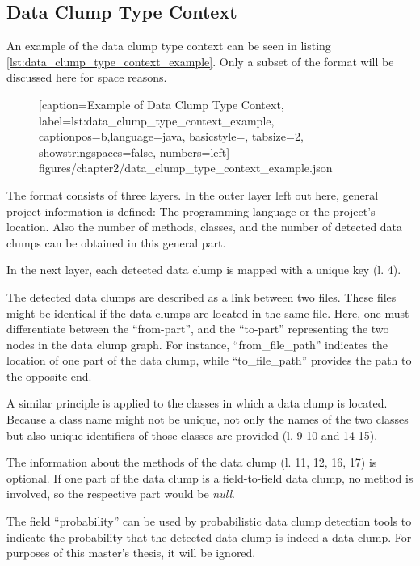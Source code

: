 
\renewcommand\appendixpagename{Appendix}
\begin{appendices}
\chapter{Data Clump Type Context}
\label{app:data_clump_format}
An example of the data clump type context can be seen in listing \ref{lst:data_clump_type_context_example}. Only a subset of the format will be discussed here for space reasons.

  \begin{figure} [htbp!]
			
			[caption={Example of Data Clump Type Context},
			label={lst:data_clump_type_context_example},
			captionpos=b,language=java, basicstyle=\footnotesize, tabsize=2, showstringspaces=false,  numbers=left]
			{figures/chapter2/data_clump_type_context_example.json}
		\end{figure}

The format consists of three layers. In the outer layer left out here, general project information is defined: The programming language or the project's location. Also the number of methods, classes, and the number of detected data clumps can be obtained in this general part. 

In the next layer, each detected data clump is mapped with a unique key (l. 4).

The detected data clumps are described as a link between two files. These files might be identical if the data clumps are located in the same file. Here, one must differentiate between the \enquote{from-part}, and the \enquote{to-part} representing the two nodes in the data clump graph. For instance, \enquote{from\_file\_path} indicates the location of one part of the data clump, while \enquote{to\_file\_path} provides the path to the opposite end. 

A similar principle is applied to the classes in which a data clump is located. Because a class name might not be unique, not only the names of the two classes but also unique identifiers of those classes are provided (l. 9-10 and 14-15).

The information about the methods of the data clump (l. 11, 12, 16, 17) is optional. If one part of the data clump is a field-to-field data clump, no method is involved, so the respective part would be \textit{null}.

The field \enquote{probability} can be used by probabilistic data clump detection tools to indicate the probability that the detected data clump is indeed a data clump. For purposes of this master's thesis, it will be ignored. 


\end{appendices}
